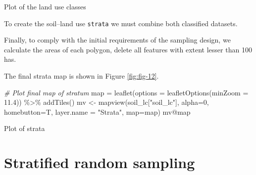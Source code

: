 \documentclass[
  10pt,
  b5paper,
  oneside]{book}
\newenvironment{Shaded}{\begin{snugshade}}{\end{snugshade}}
\newcommand{\AttributeTok}[1]{\textcolor[rgb]{0.77,0.63,0.00}{#1}}
\newcommand{\CommentTok}[1]{\textcolor[rgb]{0.56,0.35,0.01}{\textit{#1}}}
\newcommand{\DecValTok}[1]{\textcolor[rgb]{0.00,0.00,0.81}{#1}}
\newcommand{\FloatTok}[1]{\textcolor[rgb]{0.00,0.00,0.81}{#1}}
\newcommand{\FunctionTok}[1]{\textcolor[rgb]{0.00,0.00,0.00}{#1}}
\newcommand{\NormalTok}[1]{#1}
\newcommand{\OtherTok}[1]{\textcolor[rgb]{0.56,0.35,0.01}{#1}}
\newcommand{\SpecialCharTok}[1]{\textcolor[rgb]{0.00,0.00,0.00}{#1}}
\newcommand{\StringTok}[1]{\textcolor[rgb]{0.31,0.60,0.02}{#1}}
\begin{document}
\label{fig:fig-11}Plot of the land use classes

To create the soil--land use \texttt{strata} we must combine both classified datasets.

\begin{Shaded}
\end{Shaded}

Finally, to comply with the initial requirements of the sampling design, we calculate the areas of each polygon, delete all features with extent lesser than 100 has.

The final strata map is shown in Figure \ref{fig:fig-12}.

\begin{Shaded}
\begin{Highlighting}[]
   \CommentTok{\# Plot final map of stratum}
\NormalTok{  map }\OtherTok{=} \FunctionTok{leaflet}\NormalTok{(}\AttributeTok{options =} \FunctionTok{leafletOptions}\NormalTok{(}\AttributeTok{minZoom =} \FloatTok{11.4}\NormalTok{)) }\SpecialCharTok{\%\textgreater{}\%}
  \FunctionTok{addTiles}\NormalTok{()}
\NormalTok{  mv }\OtherTok{\textless{}{-}} \FunctionTok{mapview}\NormalTok{(soil\_lc[}\StringTok{"soil\_lc"}\NormalTok{], }\AttributeTok{alpha=}\DecValTok{0}\NormalTok{, }\AttributeTok{homebutton=}\NormalTok{T, }\AttributeTok{layer.name =} \StringTok{"Strata"}\NormalTok{, }\AttributeTok{map=}\NormalTok{map)}
\NormalTok{  mv}\SpecialCharTok{@}\NormalTok{map}
\end{Highlighting}
\end{Shaded}

\label{fig:fig-12}Plot of strata

\hypertarget{stratified-random-sampling}{%
\section{Stratified random sampling}\label{stratified-random-sampling}}
\end{document}
